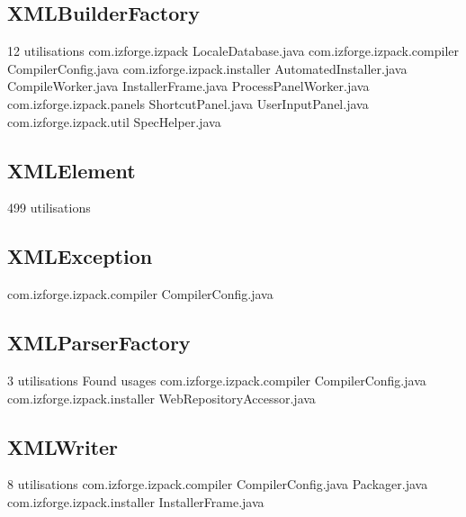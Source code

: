 \subsection{XMLBuilderFactory}
12 utilisations
  com.izforge.izpack 
    LocaleDatabase.java 
  com.izforge.izpack.compiler 
    CompilerConfig.java 
  com.izforge.izpack.installer 
    AutomatedInstaller.java 
    CompileWorker.java 
    InstallerFrame.java 
    ProcessPanelWorker.java 
  com.izforge.izpack.panels 
    ShortcutPanel.java 
    UserInputPanel.java 
  com.izforge.izpack.util 
    SpecHelper.java 

\subsection{XMLElement}
499 utilisations
\subsection{XMLException}
  com.izforge.izpack.compiler 
    CompilerConfig.java 
\subsection{XMLParserFactory}
3 utilisations
Found usages 
  com.izforge.izpack.compiler 
    CompilerConfig.java 
  com.izforge.izpack.installer 
    WebRepositoryAccessor.java 
\subsection{XMLWriter}
8 utilisations
  com.izforge.izpack.compiler 
    CompilerConfig.java 
    Packager.java 
  com.izforge.izpack.installer 
    InstallerFrame.java 
